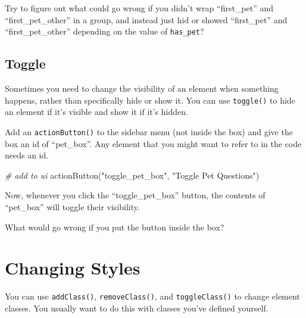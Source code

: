 \documentclass[
]{book}
\newenvironment{Shaded}{\begin{snugshade}}{\end{snugshade}}
\newcommand{\CommentTok}[1]{\textcolor[rgb]{0.56,0.35,0.01}{\textit{#1}}}
\newcommand{\FunctionTok}[1]{\textcolor[rgb]{0.00,0.00,0.00}{#1}}
\newcommand{\NormalTok}[1]{#1}
\newcommand{\SpecialCharTok}[1]{\textcolor[rgb]{0.00,0.00,0.00}{#1}}
\newcommand{\StringTok}[1]{\textcolor[rgb]{0.31,0.60,0.02}{#1}}
\begin{document}
Try to figure out what could go wrong if you didn't wrap ``first\_pet'' and ``first\_pet\_other'' in a group, and instead just hid or showed ``first\_pet'' and ``first\_pet\_other'' depending on the value of \texttt{has\_pet}?

\hypertarget{toggle}{%
\subsection{Toggle}\label{toggle}}

Sometimes you need to change the visibility of an element when something happens, rather than specifically hide or show it. You can use \texttt{toggle()} to hide an element if it's visible and show it if it's hidden.

Add an \texttt{actionButton()} to the sidebar menu (not inside the box) and give the box an id of ``pet\_box''. Any element that you might want to refer to in the code needs an id.

\begin{Shaded}
\begin{Highlighting}[]
\CommentTok{\# add to ui}
\FunctionTok{actionButton}\NormalTok{(}\StringTok{"toggle\_pet\_box"}\NormalTok{, }\StringTok{"Toggle Pet Questions"}\NormalTok{)}
\end{Highlighting}
\end{Shaded}

Now, whenever you click the ``toggle\_pet\_box'' button, the contents of ``pet\_box'' will toggle their visibility.

\begin{Shaded}
\end{Shaded}

What would go wrong if you put the button inside the box?

\hypertarget{changing-styles}{%
\section{Changing Styles}\label{changing-styles}}

You can use \texttt{addClass()}, \texttt{removeClass()}, and \texttt{toggleClass()} to change element classes. You usually want to do this with classes you've defined yourself.
\end{document}
